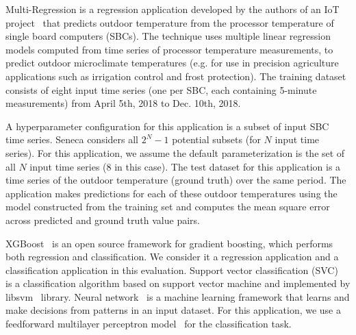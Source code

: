 Multi-Regression is a regression application 
developed by the authors of 
an IoT project~\cite{iot-cpu} that
predicts outdoor temperature from the processor 
temperature of single board computers (SBCs).  
The technique uses multiple linear regression models computed from time
series of processor temperature measurements,
to predict outdoor microclimate temperatures (e.g. for use in 
precision agriculture applications such as irrigation control and frost protection).
The training dataset consists of eight input time series (one per SBC, each containing 
5-minute measurements) from April 5th, 2018 to Dec. 10th, 2018.

A hyperparameter configuration for this application is a subset of input SBC time series.
Seneca considers all \texttt{$2^N - 1$} potential subsets (for $N$ input time series).
For this application,
we assume the default parameterization is the set of all $N$ input time series (8 in this case).
The test dataset for this application is a time series of the outdoor temperature (ground truth) 
over the same period.  The application makes predictions for each of these outdoor temperatures
using the model constructed from the training set
and computes the mean square error across predicted and ground truth value pairs.

XGBoost~\cite{ref:xgboost-web} is an open source framework for gradient boosting, which 
performs both regression and classification. We consider it a regression application and
a classification application in this evaluation.  
Support vector classification (SVC)~\cite{ref:svc} is a classification algorithm 
based on support vector machine and implemented by libsvm~\cite{ref:libsvm} library.
Neural network~\cite{ref:neural_network} is a machine learning framework that learns 
and make decisions from patterns in an input dataset. For this application, 
we use a feedforward multilayer perceptron model~\cite{ref:feedforward_nn} 
for the classification task.

